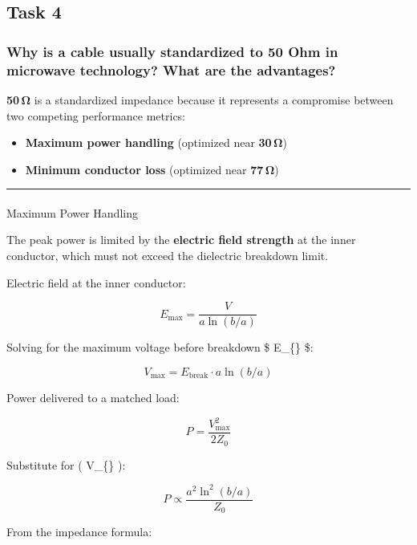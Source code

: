 \documentclass[
  letterpaper,
  DIV=11,
  numbers=noendperiod]{scrartcl}
\makeatletter
\let\oldparagraph\paragraph
\renewcommand{\paragraph}{
    \@ifstar
      \xxxParagraphStar
      \xxxParagraphNoStar
  }
\newcommand{\xxxParagraphStar}[1]{\oldparagraph*{#1}\mbox{}}
\newcommand{\xxxParagraphNoStar}[1]{\oldparagraph{#1}\mbox{}}
\providecommand{\tightlist}{%
  \setlength{\itemsep}{0pt}\setlength{\parskip}{0pt}}
\makeatother
\begin{document}
\subsection{Task 4}\label{task-4}

\subsubsection{Why is a cable usually standardized to 50 Ohm in
microwave technology? What are the
advantages?}\label{why-is-a-cable-usually-standardized-to-50-ohm-in-microwave-technology-what-are-the-advantages}

\textbf{50\,Ω} is a standardized impedance because it represents a
compromise between two competing performance metrics:

\begin{itemize}
\tightlist
\item
  \textbf{Maximum power handling} (optimized near \textbf{30\,Ω})\\
\item
  \textbf{Minimum conductor loss} (optimized near \textbf{77\,Ω})
\end{itemize}

\begin{center}\rule{0.5\linewidth}{0.5pt}\end{center}

\paragraph{Maximum Power Handling}\label{maximum-power-handling}

The peak power is limited by the \textbf{electric field strength} at the
inner conductor, which must not exceed the dielectric breakdown limit.

Electric field at the inner conductor:

\[
E_{\text{max}} = \frac{V}{a \ln(b/a)}
\]

Solving for the maximum voltage before breakdown \$ E\_\{\}
\$:

\[
V_{\text{max}} = E_{\text{break}} \cdot a \ln(b/a)
\]

Power delivered to a matched load:

\[
P = \frac{V_{\text{max}}^2}{2Z_0}
\]

Substitute for ( V\_\{\} ):

\[
P \propto \frac{a^2 \ln^2(b/a)}{Z_0}
\]

From the impedance formula:
\end{document}
